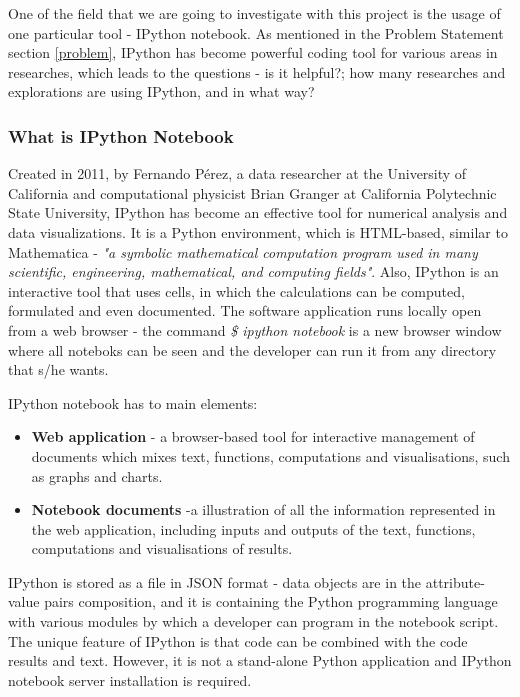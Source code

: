 
One of the field that we are going to investigate with this project is the usage of one particular tool - IPython notebook. As mentioned in the Problem Statement section \ref{problem}, IPython has become powerful coding tool for various areas in researches, which leads to the questions - is it helpful?; how many researches and explorations are using IPython, and in what way? 

\subsubsection{What is IPython Notebook}
\label{definition}

Created in 2011, by Fernando Pérez, a data researcher at the University of California and computational physicist Brian Granger at California Polytechnic State University, IPython has become an effective tool for numerical analysis and data visualizations.\cite{shen2014interactive} It is a Python environment, which is HTML-based, similar to Mathematica - \textit{"a symbolic mathematical computation program used in many scientific, engineering, mathematical, and computing fields"}. \cite{mathematicaWiki} \cite{mathematicaWolfram} Also, IPython is an interactive tool that uses cells, in which the calculations can be computed, formulated and even documented. The software application runs locally open from a web browser - the command \textit{\$ ipython notebook} is a new browser window where all noteboks can be seen and the developer can run it from any directory that s/he wants.  \cite{johansson2014introduction}

IPython notebook has to main elements:\cite{ipythonFeatures}

\begin{itemize}
\item \textbf{Web application} - a browser-based tool for interactive management of documents which mixes text, functions, computations and visualisations, such as graphs and charts. 
\item \textbf{Notebook documents} -a illustration of all the information represented in the web application, including inputs and outputs of the text, functions, computations and visualisations of results.
\end{itemize}

IPython is stored as a file in JSON format - data objects are in the attribute-value pairs composition, and it is containing the Python programming language with various modules by which a developer can program in the notebook script. The unique feature of IPython is that code can be combined with the code results and text. However, it is not a stand-alone Python application and IPython notebook server installation is required.

